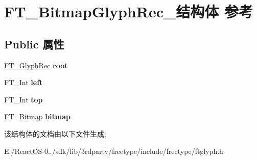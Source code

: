 \hypertarget{struct_f_t___bitmap_glyph_rec__}{}\section{F\+T\+\_\+\+Bitmap\+Glyph\+Rec\+\_\+结构体 参考}
\label{struct_f_t___bitmap_glyph_rec__}
\subsection*{Public 属性}
\begin{DoxyCompactItemize}
\item 
\mbox{\label{struct_f_t___bitmap_glyph_rec___ac3970353fbc0fe3d4c59c3fd608140f3}} 
\hyperlink{struct_f_t___glyph_rec__}{F\+T\+\_\+\+Glyph\+Rec} {\bfseries root}
\item 
\mbox{\label{struct_f_t___bitmap_glyph_rec___a6cfd2d89af7b6be4af886047c9cb7e0a}} 
F\+T\+\_\+\+Int {\bfseries left}
\item 
\mbox{\label{struct_f_t___bitmap_glyph_rec___a25fc81296678d6a2d064843c01bc05f7}} 
F\+T\+\_\+\+Int {\bfseries top}
\item 
\mbox{\label{struct_f_t___bitmap_glyph_rec___a16ecd0725920f8d5ad4c14e9448126ad}} 
\hyperlink{struct_f_t___bitmap__}{F\+T\+\_\+\+Bitmap} {\bfseries bitmap}
\end{DoxyCompactItemize}


该结构体的文档由以下文件生成\+:\begin{DoxyCompactItemize}
\item 
E\+:/\+React\+O\+S-\/0../sdk/lib/3rdparty/freetype/include/freetype/ftglyph.\+h\end{DoxyCompactItemize}
